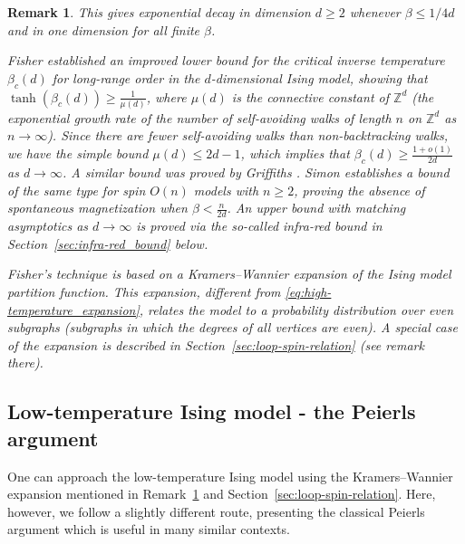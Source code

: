 \documentclass[12pt,reqno]{article}
\def\Z{\mathbb{Z}}
\newtheorem{remark}[theorem]{Remark}
\begin{document}
\begin{remark}\label{rem:Fisher_bound}
This gives exponential decay in dimension $d\ge 2$ whenever $\beta \le 1/4d$ and in one dimension for all finite $\beta$.

Fisher \cite{fisher1967critical} established an improved lower bound for the critical inverse temperature $\beta_c(d)$ for long-range order in the $d$-dimensional Ising model, showing that $\tanh(\beta_c(d))\ge \frac{1}{\mu(d)}$, where $\mu(d)$ is the connective constant of $\Z^d$ (the exponential growth rate of the number of self-avoiding walks of length $n$ on $\Z^d$ as $n\to\infty$). Since there are fewer self-avoiding walks than non-backtracking walks, we have the simple bound $\mu(d)\le 2d-1$, which implies that $\beta_c(d) \ge \frac{1+o(1)}{2d}$ as $d\to\infty$. A similar bound was proved by Griffiths \cite{griffiths1967correlations}. Simon \cite{simon1980mean} establishes a bound of the same type for spin $O(n)$ models with $n\ge 2$, proving the absence of spontaneous magnetization when $\beta<\frac{n}{2d}$. An upper bound with matching asymptotics as $d\to\infty$ is proved via the so-called infra-red bound in Section~\ref{sec:infra-red_bound} below.


Fisher's technique is based on a Kramers--Wannier \cite{KraWan41} expansion of the Ising model partition function. This expansion, different from \eqref{eq:high-temperature_expansion}, relates the model to a probability distribution over even subgraphs (subgraphs in which the degrees of all vertices are even). A special case of the expansion is described in Section~\ref{sec:loop-spin-relation} (see remark there).
\end{remark}

\subsection{Low-temperature Ising model - the Peierls argument}\label{sec:low_temperature_Ising}
One can approach the low-temperature Ising model using the Kramers--Wannier expansion mentioned in Remark~\ref{rem:Fisher_bound} and Section~\ref{sec:loop-spin-relation}.
Here, however, we follow a slightly different route, presenting the classical Peierls argument \cite{Pei36} which is useful in many similar contexts.
\end{document}
